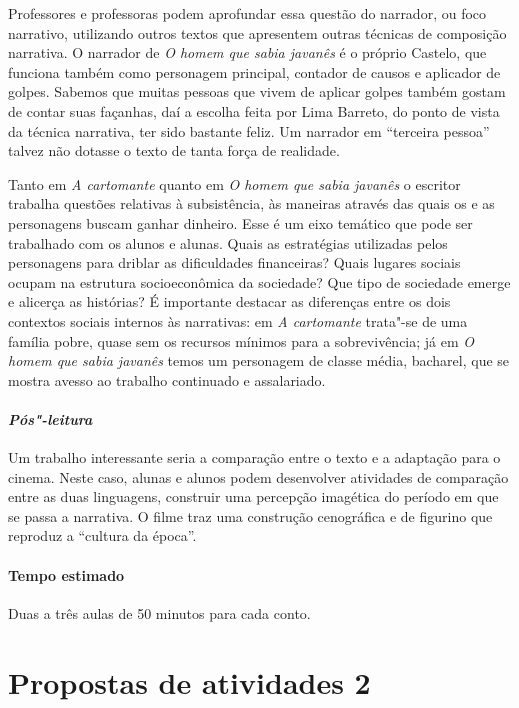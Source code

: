 \documentclass[11pt]{extarticle}
\begin{document}
{{Professores e professoras podem aprofundar essa questão do narrador, ou
foco narrativo, utilizando outros textos que apresentem outras técnicas
de composição narrativa. O narrador de \textit{\emph{O homem que sabia
javanês}} é o próprio Castelo, que funciona também como personagem
principal, contador de causos e aplicador de golpes. Sabemos que muitas
pessoas que vivem de aplicar golpes também gostam de contar suas
façanhas, daí a escolha feita por Lima Barreto, do ponto de vista da
técnica narrativa, ter sido bastante feliz. Um narrador em ``terceira
pessoa'' talvez não dotasse o texto de tanta força de realidade.

Tanto em {\textit{A cartomante}} quanto em \textit{\emph{O homem
que sabia javanês}} o escritor trabalha questões relativas à
subsistência, às maneiras através das quais os e as personagens buscam
ganhar dinheiro. Esse é um eixo temático que pode ser trabalhado com os
alunos e alunas. Quais as estratégias utilizadas pelos personagens para
driblar as dificuldades financeiras? Quais lugares sociais ocupam na
estrutura socioeconômica da sociedade? Que tipo de sociedade emerge e
alicerça as histórias? É importante destacar as diferenças entre os dois
contextos sociais internos às narrativas: em \textit{\emph{A
cartomante}} trata"-se de uma família pobre, quase sem os recursos
mínimos para a sobrevivência; já em \textit{\emph{O homem que sabia
javanês}} temos um personagem de classe média, bacharel, que se mostra
avesso ao trabalho continuado e assalariado.

\paragraph{\textit{Pós"-leitura}}

Um trabalho interessante seria a comparação entre o texto e a
adaptação para o cinema. Neste caso, alunas e alunos podem desenvolver
atividades de comparação entre as duas linguagens, construir uma
percepção imagética do período em que se passa a narrativa. O filme traz
uma construção cenográfica e de figurino que reproduz a ``cultura da
época''.

\paragraph{Tempo estimado} Duas a três aulas de 50 minutos para cada conto.

\section{Propostas de atividades 2}


}}
\end{document}
